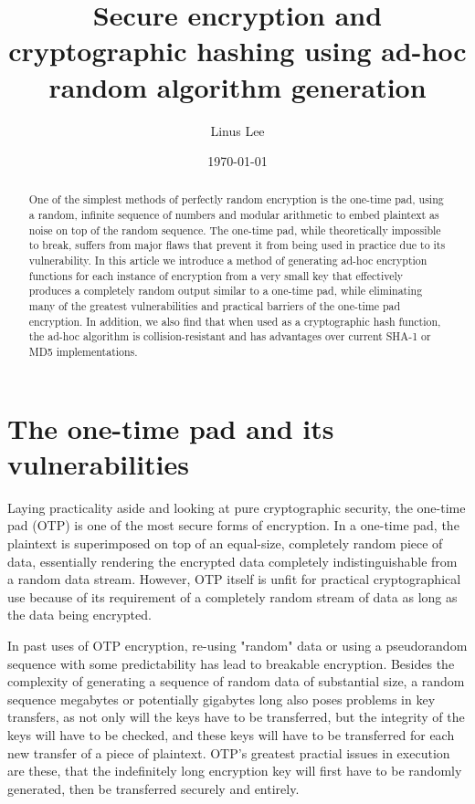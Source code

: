 \documentclass[12pt]{article}
\title{Secure encryption and cryptographic hashing using ad-hoc random algorithm generation}
\author{Linus Lee}
\date{\today}
\begin{document}
\maketitle

\begin{abstract}
  One of the simplest methods of perfectly random encryption is the one-time pad, using a random, infinite sequence of numbers and modular arithmetic to embed plaintext as noise on top of the random sequence. The one-time pad, while theoretically impossible to break, suffers from major flaws that prevent it from being used in practice due to its vulnerability. In this article we introduce a method of generating ad-hoc encryption functions for each instance of encryption from a very small key that effectively produces a completely random output similar to a one-time pad, while eliminating many of the greatest vulnerabilities and practical barriers of the one-time pad encryption. In addition, we also find that when used as a cryptographic hash function, the ad-hoc algorithm is collision-resistant and has advantages over current SHA-1 or MD5 implementations.
\end{abstract}

\tableofcontents

\section{The one-time pad and its vulnerabilities}

Laying practicality aside and looking at pure cryptographic security, the one-time pad (OTP) is one of the most secure forms of encryption. In a one-time pad, the plaintext is superimposed on top of an equal-size, completely random piece of data, essentially rendering the encrypted data completely indistinguishable from a random data stream. However, OTP itself is unfit for practical cryptographical use because of its requirement of a completely random stream of data as long as the data being encrypted.

In past uses of OTP encryption, re-using "random" data or using a pseudorandom sequence with some predictability has lead to breakable encryption. Besides the complexity of generating a sequence of random data of substantial size, a random sequence megabytes or potentially gigabytes long also poses problems in key transfers, as not only will the keys have to be transferred, but the integrity of the keys will have to be checked, and these keys will have to be transferred for each new transfer of a piece of plaintext. OTP's greatest practial issues in execution are these, that the indefinitely long encryption key will first have to be randomly generated, then be transferred securely and entirely.
\end{document}
